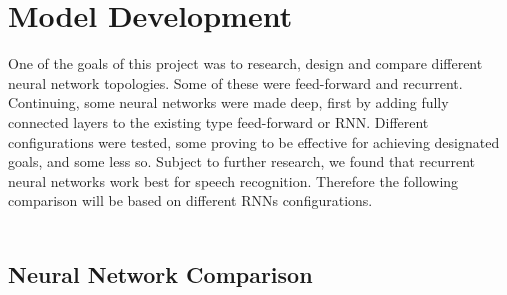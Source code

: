 \chapter{Model Development}\label{ch:model_development}
One of the goals of this project was to research, design and compare different neural network topologies. 
Some of these were feed-forward and recurrent.
Continuing, some neural networks were made deep, first by adding fully connected layers to the existing type feed-forward or RNN.
Different configurations were tested, some proving to be effective for achieving designated goals, and some less so.
Subject to further research, we found that recurrent neural networks work best for speech recognition.
Therefore  the following comparison will be based on different RNNs configurations.\\\\
\section{Neural Network Comparison}\label{sec:NNComparison}

